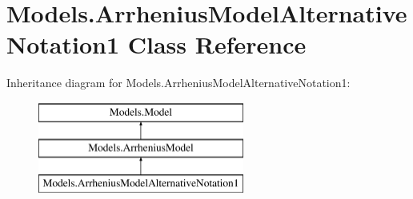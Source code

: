 \hypertarget{classModels_1_1ArrheniusModelAlternativeNotation1}{\section{\-Models.\-Arrhenius\-Model\-Alternative\-Notation1 \-Class \-Reference}
\label{classModels_1_1ArrheniusModelAlternativeNotation1}
}
\-Inheritance diagram for \-Models.\-Arrhenius\-Model\-Alternative\-Notation1\-:\begin{figure}[H]
\begin{center}
\leavevmode
\includegraphics[height=3.000000cm]{classModels_1_1ArrheniusModelAlternativeNotation1}
\end{center}
\end{figure}
